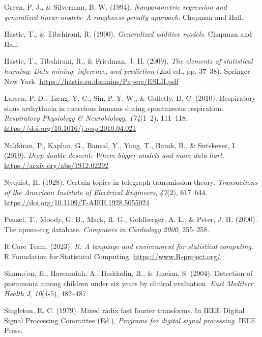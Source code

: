 \documentclass[
]{article}
\newlength{\cslhangindent}
\newlength{\cslentryspacingunit} %
\newenvironment{CSLReferences}[2] %
 {%
  \setlength{\parindent}{0pt}
  \ifodd #1
  \let\oldpar\par
  \def\par{\hangindent=\cslhangindent\oldpar}
  \fi
  \setlength{\parskip}{#2\cslentryspacingunit}
 }%
 {}
\begin{document}
\begin{CSLReferences}{1}{1}
\leavevmode{}%
Green, P. J., \& Silverman, B. W. (1994). \emph{Nonparametric regression
and generalized linear models: A roughness penalty approach}. {Chapman
and Hall}.

\leavevmode{}%
Hastie, T., \& Tibshirani, R. (1990). \emph{Generalized additive
models}. {Chapman and Hall}.

\leavevmode{}%
Hastie, T., Tibshirani, R., \& Friedman, J. H. (2009). \emph{The
elements of statistical learning: Data mining, inference, and
prediction} (2nd ed., pp. 37--38). Springer New York.
\url{https://hastie.su.domains/Papers/ESLII.pdf}

\leavevmode{}%
Larsen, P. D., Tzeng, Y. C., Sin, P. Y. W., \& Galletly, D. C. (2010).
Respiratory sinus arrhythmia in conscious humans during spontaneous
respiration. \emph{Respiratory Physiology \& Neurobiology},
\emph{174}(1--2), 111--118.
\url{https://doi.org/10.1016/j.resp.2010.04.021}

\leavevmode{}%
Nakkiran, P., Kaplun, G., Bansal, Y., Yang, T., Barak, B., \& Sutskever,
I. (2019). \emph{Deep double descent: Where bigger models and more data
hurt}. \url{https://arxiv.org/abs/1912.02292}

\leavevmode{}%
Nyquist, H. (1928). Certain topics in telegraph transmission theory.
\emph{Transactions of the American Institute of Electrical Engineers},
\emph{47}(2), 617--644.
\url{https://doi.org/10.1109/T-AIEE.1928.5055024}

\leavevmode{}%
Penzel, T., Moody, G. B., Mark, R. G., Goldberger, A. L., \& Peter, J.
H. (2000). The apnea-ecg database. \emph{Computers in Cardiology 2000},
255--258.

\leavevmode{}%
R Core Team. (2023). \emph{R: A language and environment for statistical
computing}. R Foundation for Statistical Computing.
\url{https://www.R-project.org/}

\leavevmode{}%
Shamo'on, H., Hawamdah, A., Haddadin, R., \& Jmeian, S. (2004).
Detection of pneumonia among children under six years by clinical
evaluation. \emph{East Mediterr Health J}, \emph{10}(4-5), 482--487.

\leavevmode{}%
Singleton, R. C. (1979). Mixed radix fast fourier transforms. In IEEE
Digital Signal Processing Committee (Ed.), \emph{Programs for digital
signal processing}. IEEE Press.


\end{CSLReferences}
\end{document}
